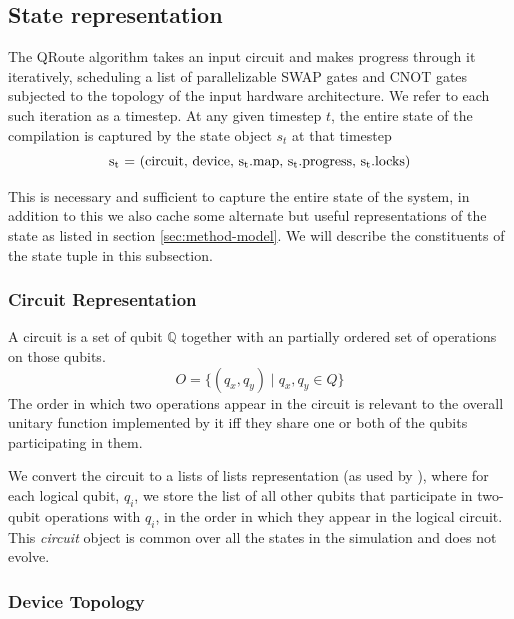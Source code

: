 \documentclass[%
 reprint,
 amsmath,amssymb,
 aps,
]{revtex4-2}
\begin{document}
\subsection{\label{sec:method-state}State representation}

The QRoute algorithm takes an input circuit and makes progress through it iteratively, scheduling a list of parallelizable SWAP gates and CNOT gates subjected to the topology of the input hardware architecture. We refer to each such iteration as a timestep. At any given timestep $t$, the entire state of the compilation is captured by the state object $s_t$ at that timestep 
\begin{equation*}
    \textrm{s\textsubscript{t} = (circuit, device, s\textsubscript{t}.map, s\textsubscript{t}.progress, s\textsubscript{t}.locks)}
\end{equation*}

This is necessary and sufficient to capture the entire state of the system, in addition to this we also cache some alternate but useful representations of the state as listed in section \ref{sec:method-model}. We will describe the constituents of the state tuple in this subsection.

\subsubsection{\label{sec:method-state-circuit}Circuit Representation}

A circuit is a set of qubit $\mathbb{Q}$ together with an partially ordered set of operations on those qubits. 
\begin{equation*}
    O = \{(q_x, q_y) \mid q_x, q_y \in Q\}
\end{equation*}
The order in which two operations appear in the circuit is relevant to the overall unitary function implemented by it iff they share one or both of the qubits participating in them.

We convert the circuit to a lists of lists representation (as used by \citet{qroute_dqn2}), where for each logical qubit, $q_i$, we store the list of all other qubits that participate in two-qubit operations with $q_i$, in the order in which they appear in the logical circuit. 
This \textit{circuit} object is common over all the states in the simulation and does not evolve.

\subsubsection{\label{sec:method-state-device}Device Topology}
\end{document}
